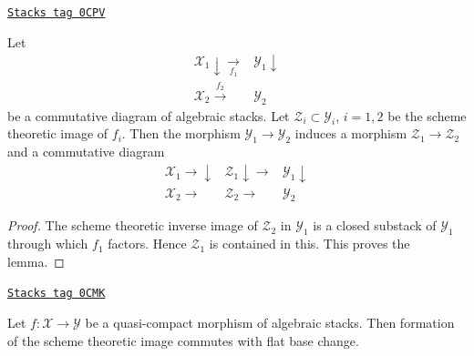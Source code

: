 \begin{lemma}
\label{stacks-morphisms-lemma-factor-factor}
\href{https://stacks.math.columbia.edu/tag/0CPV}{\texttt{Stacks tag 0CPV}}

Let
$$
\begin{array}{cc}\mathcal{X}_1 \downarrow\underset{f_1}{\longrightarrow} & \mathcal{Y}_1 \downarrow \\ \mathcal{X}_2 \overset{f_2}{\longrightarrow} & \mathcal{Y}_2\end{array}
$$
be a commutative diagram of algebraic stacks.
Let $\mathcal{Z}_i \subset \mathcal{Y}_i$, $i = 1, 2$ be
the scheme theoretic image of $f_i$. Then the morphism
$\mathcal{Y}_1 \to \mathcal{Y}_2$ induces a morphism
$\mathcal{Z}_1 \to \mathcal{Z}_2$ and a
commutative diagram
$$
\begin{array}{ccc}\mathcal{X}_1 \longrightarrow\downarrow & \mathcal{Z}_1 \downarrow\longrightarrow & \mathcal{Y}_1 \downarrow \\ \mathcal{X}_2 \longrightarrow & \mathcal{Z}_2 \longrightarrow & \mathcal{Y}_2\end{array}
$$
\end{lemma}

\begin{proof}
The scheme theoretic inverse image of $\mathcal{Z}_2$ in $\mathcal{Y}_1$
is a closed substack of $\mathcal{Y}_1$ through
which $f_1$ factors. Hence $\mathcal{Z}_1$ is contained in this.
This proves the lemma.
\end{proof}

\begin{lemma}
\label{stacks-morphisms-lemma-existence-plus-flat-base-change}
\href{https://stacks.math.columbia.edu/tag/0CMK}{\texttt{Stacks tag 0CMK}}

Let $f : \mathcal{X} \to \mathcal{Y}$ be a quasi-compact
morphism of algebraic stacks. Then formation of the scheme theoretic image
commutes with flat base change.
\end{lemma}

